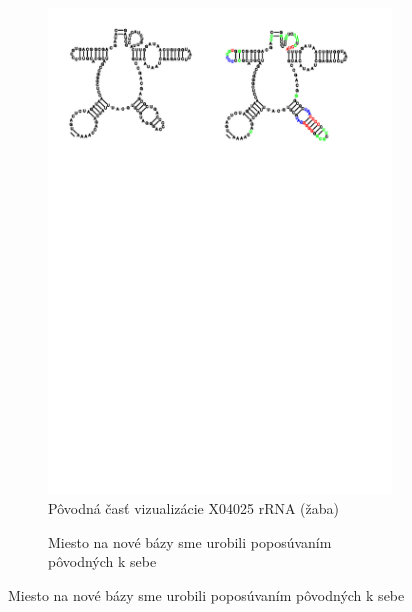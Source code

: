 \begin{figure}
  \centering
  \begin{subfigure}{\wi}
    \caption{Pôvodná časť vizualizácie X04025 rRNA (žaba)}
    \includegraphics[clip, trim=1cm 21cm 12cm 1cm, width=1\textwidth]{../img/alg/insert/multibranch}
  \end{subfigure}
  \begin{subfigure}{\wi}
    \caption{Miesto na nové bázy sme urobili poposúvaním pôvodných k sebe}

\end{subfigure}
\end{figure}
